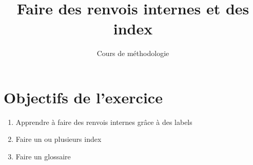 \documentclass[12pt,twoside]{book}
\title{Faire des renvois internes et des index}
\author{Cours de méthodologie}
\begin{document}
\maketitle

\section*{Objectifs de l'exercice}
\begin{enumerate}
  \item Apprendre à faire des renvois internes grâce à des labels

  \item  Faire un ou plusieurs index


\item Faire un glossaire 

\end{enumerate}
\end{document}
